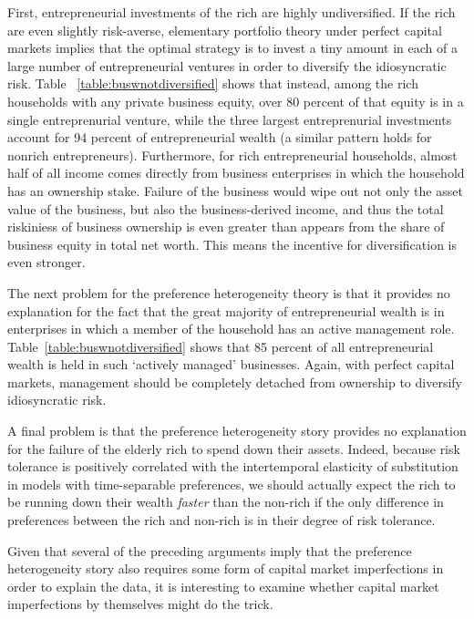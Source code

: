 \documentclass[12pt]{article}
\begin{document}
{\normalsize First, entrepreneurial investments of the rich are highly
undiversified. If the rich are even slightly risk-averse, elementary
portfolio theory under perfect capital markets implies that the optimal
strategy is to invest a tiny amount in each of a large number of
entrepreneurial ventures in order to diversify the idiosyncratic risk. Table~%
\ref{table:buswnotdiversified} shows that instead, among the rich households
with any private business equity, over 80 percent of that equity is in a
single entreprenurial venture, while the three largest entreprenurial
investments account for 94 percent of entrepreneurial wealth (a similar
pattern holds for nonrich entrepreneurs). Furthermore, for rich
entrepreneurial households, almost half of all income comes directly from
business enterprises in which the household has an ownership stake. Failure
of the business would wipe out not only the asset value of the business, but
also the business-derived income, and thus the total riskiniess of business
ownership is even greater than appears from the share of business equity in
total net worth. This means the incentive for diversification is even
stronger. }

{\normalsize The next problem for the preference heterogeneity theory is
that it provides no explanation for the fact that the great majority of
entrepreneurial wealth is in enterprises in which a member of the household
has an active management role. Table~\ref{table:buswnotdiversified} shows
that 85 percent of all entrepreneurial wealth is held in such `actively
managed' businesses. Again, with perfect capital markets, management should
be completely detached from ownership to diversify idiosyncratic risk. }

{\normalsize A final problem is that the preference heterogeneity story
provides no explanation for the failure of the elderly rich to spend down
their assets. Indeed, because risk tolerance is positively correlated with
the intertemporal elasticity of substitution in models with time-separable
preferences, we should actually expect the rich to be running down their
wealth \textit{faster} than the non-rich if the only difference in
preferences between the rich and non-rich is in their degree of risk
tolerance. }

{\normalsize Given that several of the preceding arguments imply that the
preference heterogeneity story also requires some form of capital market
imperfections in order to explain the data, it is interesting to examine
whether capital market imperfections by themselves might do the trick. }
\end{document}
